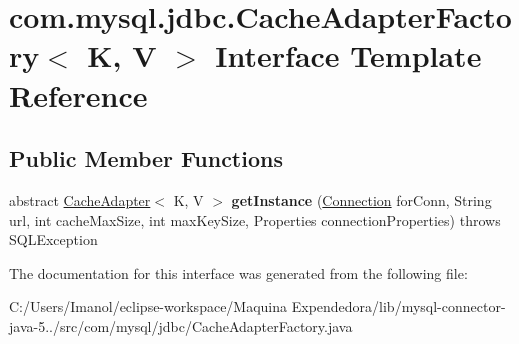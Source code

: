 \hypertarget{interfacecom_1_1mysql_1_1jdbc_1_1_cache_adapter_factory}{}\section{com.\+mysql.\+jdbc.\+Cache\+Adapter\+Factory$<$ K, V $>$ Interface Template Reference}
\label{interfacecom_1_1mysql_1_1jdbc_1_1_cache_adapter_factory}
\subsection*{Public Member Functions}
\begin{DoxyCompactItemize}
\item 
\mbox{\label{interfacecom_1_1mysql_1_1jdbc_1_1_cache_adapter_factory_a9f83177b435657627655240e3e9c5db6}} 
abstract \mbox{\hyperlink{interfacecom_1_1mysql_1_1jdbc_1_1_cache_adapter}{Cache\+Adapter}}$<$ K, V $>$ {\bfseries get\+Instance} (\mbox{\hyperlink{interfacecom_1_1mysql_1_1jdbc_1_1_connection}{Connection}} for\+Conn, String url, int cache\+Max\+Size, int max\+Key\+Size, Properties connection\+Properties)  throws S\+Q\+L\+Exception
\end{DoxyCompactItemize}


The documentation for this interface was generated from the following file\+:\begin{DoxyCompactItemize}
\item 
C\+:/\+Users/\+Imanol/eclipse-\/workspace/\+Maquina Expendedora/lib/mysql-\/connector-\/java-\/5../src/com/mysql/jdbc/Cache\+Adapter\+Factory.\+java\end{DoxyCompactItemize}
